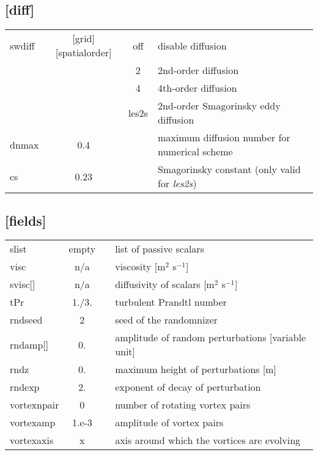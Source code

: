 \documentclass[a4paper,10pt]{extarticle}
\begin{document}
\subsection*{[diff]}
\tablelasttail{\hline}
\begin{supertabular}{lccl}
swdiff        & [grid][spatialorder] & off   & disable diffusion \\
              &                      & 2     & 2nd-order diffusion \\
              &                      & 4     & 4th-order diffusion \\
              &                      & les2s & 2nd-order Smagorinsky eddy diffusion \\
dnmax         & 0.4                  &       & maximum diffusion number for numerical scheme \\
cs            & 0.23                 &       & Smagorinsky constant (only valid for \textit{les2s}) \\
\end{supertabular}
\subsection*{[fields]}
\tablelasttail{\hline}
\begin{supertabular}{lccl}
slist         & empty &  & list of passive scalars \\
visc          & n/a   &  & viscosity [m$^2$ s$^{-1}$] \\
svisc[]       & n/a   &  & diffusivity of scalars [m$^2$ s$^{-1}$] \\
tPr           & 1./3. &  & turbulent Prandtl number \\
rndseed       & 2     &  & seed of the randomnizer \\
rndamp[]      & 0.    &  & amplitude of random perturbations [variable unit] \\
rndz          & 0.    &  & maximum height of perturbations [m] \\
rndexp        & 2.    &  & exponent of decay of perturbation \\
vortexnpair   & 0     &  & number of rotating vortex pairs \\
vortexamp     & 1.e-3 &  & amplitude of vortex pairs \\
vortexaxis    & x     &  & axis around which the vortices are evolving \\
\end{supertabular}
\end{document}
